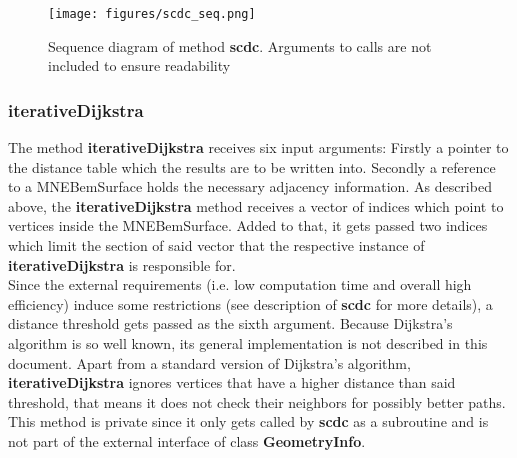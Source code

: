 \clearpage

\begin{figure}[h]
	\begin{center}
		\texttt{[image: figures/scdc\_seq.png]}
		\caption{Sequence diagram of method \textbf{scdc}. Arguments to calls are not included to ensure readability}
	\end{center}
\end{figure}

\subsubsection{iterativeDijkstra}
The method \textbf{iterativeDijkstra} receives six input arguments: Firstly a pointer to the distance table which the results are to be written into. Secondly a reference to a MNEBemSurface holds the necessary adjacency information. As described above, the \textbf{iterativeDijkstra} method receives a vector of indices which point to vertices inside the MNEBemSurface. Added to that, it gets passed two indices which limit the section of said vector that the respective instance of \textbf{iterativeDijkstra} is responsible for.\\
Since the external requirements (i.e. low computation time and overall high efficiency) induce some restrictions (see description of \textbf{scdc} for more details), a distance threshold gets passed as the sixth argument. Because Dijkstra's algorithm is so well known, its general implementation is not described in this document. Apart from a standard version of Dijkstra's algorithm, \textbf{iterativeDijkstra} ignores vertices that have a higher distance than said threshold, that means it does not check their neighbors for possibly better paths.\\
This method is private since it only gets called by \textbf{scdc} as a subroutine and is not part of the external interface of class \textbf{GeometryInfo}.

